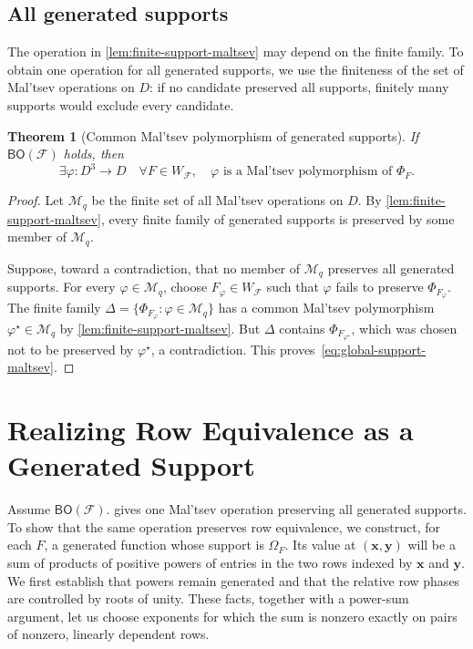 \documentclass[11pt,letterpaper,onecolumn]{article}
\theoremstyle{plain}
\newtheorem{theorem}{Theorem}[section]
\theoremstyle{definition}
\theoremstyle{remark}
\newcommand{\cF}{\mathcal F}
\newcommand{\BO}{\mathsf{BO}}
\newcommand{\SuppRel}[1]{\Phi_{#1}}
\newcommand{\RowEq}[1]{\Omega_{#1}}
\begin{document}
\subsection{All generated supports}

The operation in \cref{lem:finite-support-maltsev} may depend on the
finite family.  To obtain one operation for all generated supports,
we use the finiteness of the set of Mal'tsev operations on $D$:
if no candidate preserved all supports, finitely many supports would
exclude every candidate.

\begin{theorem}[Common Mal'tsev polymorphism of generated supports]
\label{thm:common-support-maltsev}
If $\BO(\cF)$ holds, then
\begin{equation}
  \exists\varphi:D^3\to D\quad\forall F\in W_{\cF},\quad
  \varphi\text{ is a Mal'tsev polymorphism of }\SuppRel F.
  \label{eq:global-support-maltsev}
\end{equation}
\end{theorem}

\begin{proof}
Let $\mathcal M_q$ be the finite set of all Mal'tsev operations on
$D$.  By \cref{lem:finite-support-maltsev}, every finite family of generated
supports is preserved by some member of $\mathcal M_q$.

Suppose, toward a contradiction, that no member of $\mathcal M_q$ preserves
all generated supports.  For every $\varphi\in\mathcal M_q$, choose
$F_\varphi\in W_{\cF}$ such that $\varphi$ fails to preserve $\SuppRel{F_\varphi}$.
The finite family $\Delta=\{\SuppRel{F_\varphi}:\varphi\in\mathcal M_q\}$ has a common Mal'tsev polymorphism $\varphi^\star\in\mathcal M_q$ by
\cref{lem:finite-support-maltsev}.  But $\Delta$ contains
$\SuppRel{F_{\varphi^\star}}$, which was chosen not to be preserved by
$\varphi^\star$, a contradiction.  This proves~\eqref{eq:global-support-maltsev}.
\end{proof}

\section{Realizing Row Equivalence as a Generated Support}
\label{sec:omega-realization}

Assume $\BO(\cF)$.   gives one Mal'tsev
operation preserving all generated supports.  To show that the same
operation preserves row equivalence, we construct, for each $F$, a
generated function whose support is $\RowEq F$.  Its value at
$(\mathbf x,\mathbf y)$ will be a sum of products of positive powers of
entries in the two rows indexed by $\mathbf x$ and $\mathbf y$.  We
first establish that powers remain generated and that the relative row
phases are controlled by roots of unity.  These facts, together with a
power-sum argument, let us choose exponents for which the sum is nonzero
exactly on pairs of nonzero, linearly dependent rows.
\end{document}
